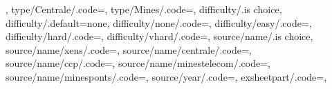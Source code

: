 {{{{}}
  },
  type/Centrale/.code={\def\extypechar{\makesamewidth[c]{Cent.}}},
  type/Mines/.code={\def\extypechar{\makesamewidth[c]{Mines}}},
  difficulty/.is choice,
  difficulty/.default=none,
  difficulty/none/.code={\def\exdiffchar{}\gdef\exdiffvalue{none}},
  difficulty/easy/.code={\def\exdiffchar{%
      \makesamewidth[c]{\faHandPeaceO}\gdef\exdiffvalue{easy}%
    }},
  difficulty/hard/.code={\def\exdiffchar{%
      \makesamewidth[c]{\Lightning}\gdef\exdiffvalue{hard}%
    }},
  difficulty/vhard/.code={\def\exdiffchar{%
      \makesamewidth[c]{\Lightning\!\Lightning}%
      \gdef\exdiffvalue{vhard}
    }},
  source/name/.is choice,
  source/name/xens/.code={\def\sourcename{X-ENS-ESPCI}},
  source/name/centrale/.code={\def\sourcename{Centrale-Supélec}},
  source/name/ccp/.code={\def\sourcename{CCP}},
  source/name/minestelecom/.code={\def\sourcename{Mines-Télécom}},
  source/name/minesponts/.code={\def\sourcename{Mines-Ponts}},
  source/year/.code={\def\sourceyear{#1}},
  exsheetpart/.code={\def\exsheetpart{#1}},
}

\makeatletter{}
\def\nbrofchapters{}
\def\mycontentsline#1#2#3#4#5#6#7#8{%
  \message{!!!!!!! SEMAINE #1, #2, #3, #4, #5, #6, #7, #8}
  \def\semainenbr{#1}%
  \def\thechapternbr{#2}%
  \def\chaptertitle{#3}%
  \def\sectionnbr{#4}%
  \def\thesectionnbr{#5}%
  \def\theenvname{#6}%
  \def\questype{#7}%
  \ifcsname chapter-\thechapternbr\endcsname%
  \else%
  \expandafter%
  \xdef\csname chapter-\thechapternbr\endcsname{%
    \chaptertitle}%
  \listxadd{\chapters}{Chapitre
    \rom{\thechapternbr}:~\chaptertitle}%
  \listxadd{\nbrofchapters}{\thechapternbr}%
  \fi%
  \expandafter\def\csname\questype-chapter\endcsname{
    There are some of this type}
  \listcsxadd{\questype-chapter-\thechapternbr}{#8}%
  \listcsxadd{type-\questype}{#8}%
}%
\makeatother{}

\show\leqslant
\makeatletter
{}
\makeatother
%

